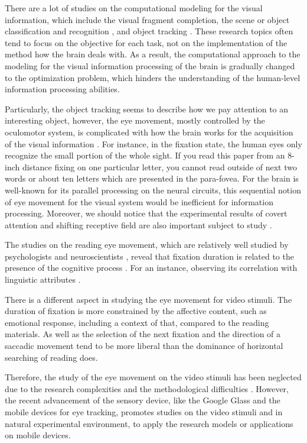 \documentclass[oneside,master]{snueethesis}
\begin{document}
There are a lot of studies on the computational modeling for the visual information, which include the visual fragment completion, the scene or object classification and recognition \cite{winn2005,lazebnik2006}, and object tracking \cite{YiWu2013}. These research topics often tend to focus on the objective for each task, not on the implementation of the method how the brain deals with. As a result, the computational approach to the modeling for the visual information processing of the brain is gradually changed to the optimization problem, which hinders the understanding of the human-level information processing abilities. 

Particularly, the object tracking seems to describe how we pay attention to an interesting object, however, the eye movement, mostly controlled by the oculomotor system, is complicated with how the brain works for the acquisition of the visual information \cite{Henderson2003}. For instance, in the fixation state, the human eyes only recognize the small portion of the whole sight. If you read this paper from an 8-inch distance fixing on one particular letter, you cannot read outside of next two words or about ten letters which are presented in the para-fovea. For the brain is well-known for its parallel processing on the neural circuits, this sequential notion of eye movement for the visual system would be inefficient for information processing. Moreover, we should notice that the experimental results of covert attention and shifting receptive field are also important subject to study \cite{Zirnsak2014}.

The studies on the reading eye movement, which are relatively well studied by psychologists and neuroscientists \cite{Rayner1998,Reichle1998}, reveal that fixation duration is related to the presence of the cognitive process \cite{Rayner1997}. For an instance, observing its correlation with linguistic attributes \cite{Inhoff1986,Rayner1986}.

There is a different aspect in studying the eye movement for video stimuli. The duration of fixation is more constrained by the affective content, such as emotional response, including a context of that, compared to the reading materials. As well as the selection of the next fixation and the direction of a saccadic movement tend to be more liberal than the dominance of horizontal searching of reading does. 

Therefore, the study of the eye movement on the video stimuli has been neglected due to the research complexities and the methodological difficulties \cite{Tatler2011}. However, the recent advancement of the sensory device, like the Google Glass and the mobile devices for eye tracking, promotes studies on the video stimuli and in natural experimental environment, to apply the research models or applications on mobile devices. 
\end{document}
